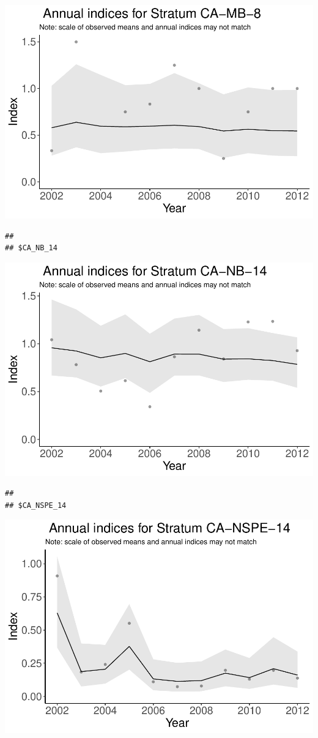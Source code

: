 \documentclass[]{article}
\begin{document}
\includegraphics{index_files/figure-latex/unnamed-chunk-7-5.pdf}

\begin{verbatim}
## 
## $CA_NB_14
\end{verbatim}

\includegraphics{index_files/figure-latex/unnamed-chunk-7-6.pdf}

\begin{verbatim}
## 
## $CA_NSPE_14
\end{verbatim}

\includegraphics{index_files/figure-latex/unnamed-chunk-7-7.pdf}
\end{document}

